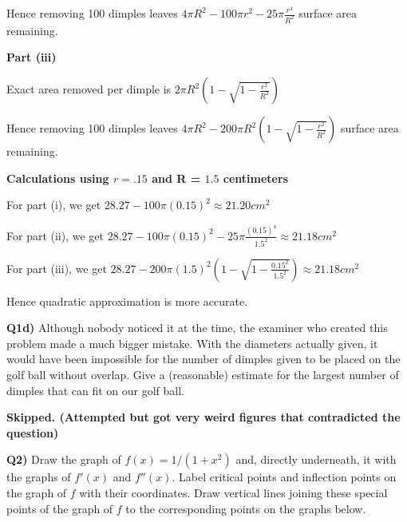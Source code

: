 \documentclass[9pt]{article}
\begin{document}
Hence removing 100 dimples leaves $4 \pi R^2 - 100 \pi r^2 - 25 \pi \frac{r^4}{R^2}$ surface area remaining.

\textbf{Part (iii)}

Exact area removed per dimple is $2 \pi R^2 (1 - \sqrt{1 - \frac{r^2}{R^2}})$

Hence removing 100 dimples leaves $4 \pi R^2 - 200 \pi R^2 (1 - \sqrt{1 - \frac{r^2}{R^2}})$ surface area remaining.

\textbf{Calculations using $r = .15$ and R = $1.5$ centimeters}

For part (i), we get $28.27 - 100 \pi (0.15)^2 \approx 21.20 cm^2$

For part (ii), we get $28.27 - 100 \pi (0.15)^2 - 25 \pi \frac{(0.15)^4}{1.5^2} \approx 21.18 cm^2$

For part (iii), we get $28.27 - 200 \pi (1.5)^2 (1 - \sqrt{1 - \frac{0.15^2}{1.5^2}}) \approx 21.18cm^2$

Hence quadratic approximation is more accurate.


\begin{tcolorbox}
  \textbf{Q1d)} Although nobody noticed it at the time, the examiner who created this problem made a much bigger mistake. With the diameters actually given, it would have been impossible for the number of dimples given to be placed on the golf ball without overlap. Give a (reasonable) estimate for the largest number of dimples that can fit on our golf ball.
\end{tcolorbox}

\textbf{Skipped. (Attempted but got very weird figures that contradicted the question)}


\begin{tcolorbox}
  \textbf{Q2)} Draw the graph of $f(x) = 1/(1 + x^2)$ and, directly underneath, it with the graphs of $f'(x)$ and $f''(x)$. Label critical points and inflection points on the graph of $f$ with their coordinates. Draw vertical lines joining these special points of the graph of $f$ to the corresponding points on the graphs below.
\end{tcolorbox}
\end{document}
